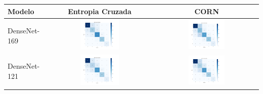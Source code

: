 \begin{table}[!htbp]
    \centering
    \begin{tabular}{|l|c|c|}
        \hline
        \textbf{Modelo} & \textbf{Entropia Cruzada} & \textbf{CORN} \\ \hline
        DenseNet-169 & \includegraphics[width=0.37\textwidth]{figs/confusion_matrices/densenet169_cm_cross_entropy.png} & \includegraphics[width=0.37\textwidth]{figs/confusion_matrices/densenet169_cm_corn.png} \\ \hline
        DenseNet-121 & \includegraphics[width=0.37\textwidth]{figs/confusion_matrices/densenet121_cm_cross_entropy.png} & \includegraphics[width=0.37\textwidth]{figs/confusion_matrices/densenet121_cm_corn.png} \\ \hline

\end{tabular}
\end{table}
